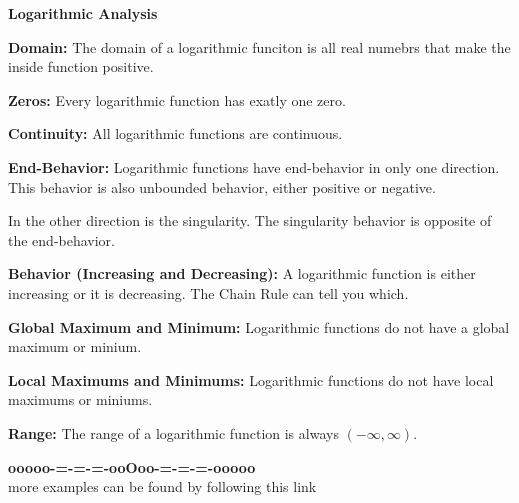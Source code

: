 \documentclass{ximera}
\begin{document}
\begin{summary}\textbf{\textcolor{red!70!yellow}{Logarithmic Analysis}}


\textbf{Domain:} The domain of a logarithmic funciton is all real numebrs that make the inside function positive.

\textbf{Zeros:} Every logarithmic function has exatly one zero.

\textbf{Continuity:} All logarithmic functions are continuous.

\textbf{End-Behavior:} Logarithmic functions have end-behavior in only one direction.  This behavior is also unbounded behavior, either positive or negative.

In the other direction is the singularity. The singularity behavior is opposite of the end-behavior.


\textbf{Behavior (Increasing and Decreasing):} A logarithmic function is either increasing or it is decreasing.  The Chain Rule can tell you which.

\textbf{Global Maximum and Minimum:} Logarithmic functions do not have a global maximum or minium.

\textbf{Local Maximums and Minimums:}  Logarithmic functions do not have local maximums or miniums.

\textbf{Range:} The range of a logarithmic function is always $(-\infty, \infty)$.



\end{summary}







\begin{center}
\textbf{\textcolor{green!50!black}{ooooo-=-=-=-ooOoo-=-=-=-ooooo}} \\

more examples can be found by following this link\\ 

\end{center}
\end{document}
